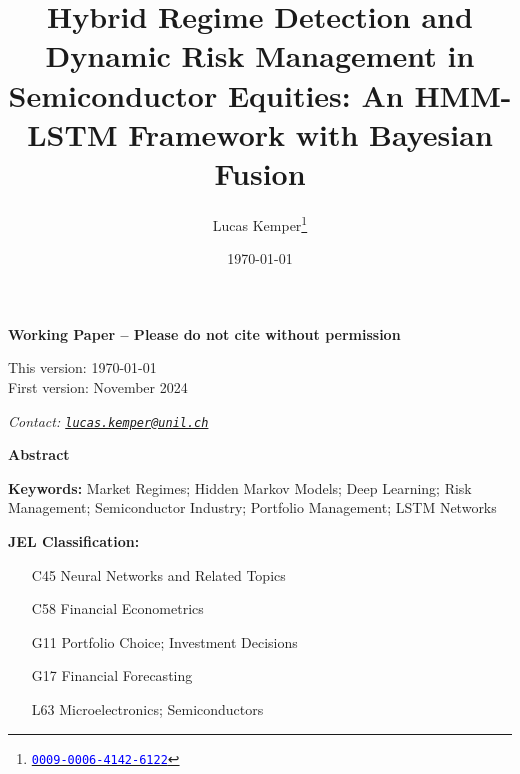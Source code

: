 \documentclass[12pt,a4paper]{article}
\title{
    \vspace{-2em}  %
    \LARGE\textbf{Hybrid Regime Detection and Dynamic Risk Management in Semiconductor Equities: An HMM-LSTM Framework with Bayesian Fusion}
    \vspace{-0.5em}
}
\author[1]{Lucas Kemper\thanks{\href{https://orcid.org/0009-0006-4142-6122}{\textcolor{blue}{\faOrcid\space\texttt{0009-0006-4142-6122}}}}}
\affil[1]{MscF Student, HEC Lausanne, University of Lausanne}
\date{\today}
\renewenvironment{abstract}{
    \begin{center}
        \bfseries\large Abstract
    \end{center}
    \quotation\small
}{\endquotation}
\begin{document}
\maketitle

\begin{center}
\large\textbf{Working Paper -- Please do not cite without permission}
\vspace{1em}

\normalsize
This version: \today\\
First version: November 2024

\vspace{1em}
\textit{Contact: \href{mailto:lucas.kemper@unil.ch}{\texttt{lucas.kemper@unil.ch}}}
\end{center}

\newpage

\begin{abstract}

\end{abstract}

\vspace{1em}
\noindent\textbf{Keywords:} Market Regimes; Hidden Markov Models; Deep Learning; Risk Management; Semiconductor Industry; Portfolio Management; LSTM Networks

\vspace{0.5em}
\noindent\textbf{JEL Classification:}
\begin{itemize}[noitemsep,labelindent=0pt,labelsep=1em]
    \item[C45] Neural Networks and Related Topics
    \item[C58] Financial Econometrics
    \item[G11] Portfolio Choice; Investment Decisions
    \item[G17] Financial Forecasting
    \item[L63] Microelectronics; Semiconductors
\end{itemize}







\printbibliography
\end{document}
